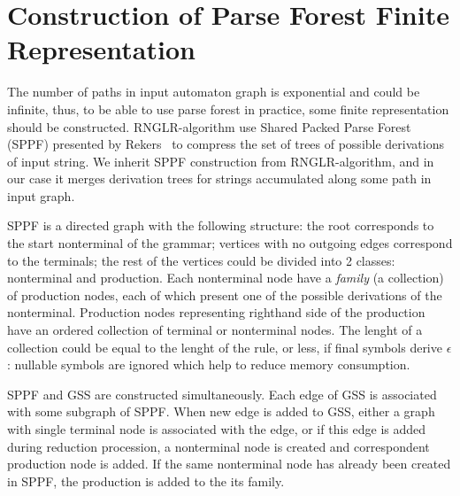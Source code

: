 \section{Construction of Parse Forest Finite Representation}
The number of paths in input automaton graph is exponential and could be infinite,
thus, to be able to use parse forest in practice, some finite representation should 
be constructed. RNGLR-algorithm use Shared Packed Parse Forest (SPPF) presented by 
Rekers~\cite{SPPF} to compress the set of trees of possible derivations of input string. 
We inherit SPPF construction from RNGLR-algorithm, and in our case it merges derivation
trees for strings accumulated along some path in input graph. 

SPPF is a directed graph with the following structure: the root corresponds to the start
nonterminal of the grammar; vertices with no outgoing edges correspond to the terminals;
the rest of the vertices could be divided into 2 classes: nonterminal and production. 
Each nonterminal node have a \emph{family} (a collection) of production nodes, each of 
which present one of the possible derivations of the nonterminal. Production nodes 
representing righthand side of the production have an ordered collection of terminal or 
nonterminal nodes. The lenght of a collection could be equal to the lenght of the rule,
or less, if final symbols derive $\epsilon$: nullable symbols are ignored which help to
reduce memory consumption. 

SPPF and GSS are constructed simultaneously. Each edge of GSS is associated with some 
subgraph of SPPF. When new edge is added to GSS, either a graph with single terminal 
node is associated with the edge, or if this edge is added during reduction procession, 
a nonterminal node is created and correspondent production node is added. If the same 
nonterminal node has already been created in SPPF, the production is added to the its 
family.
